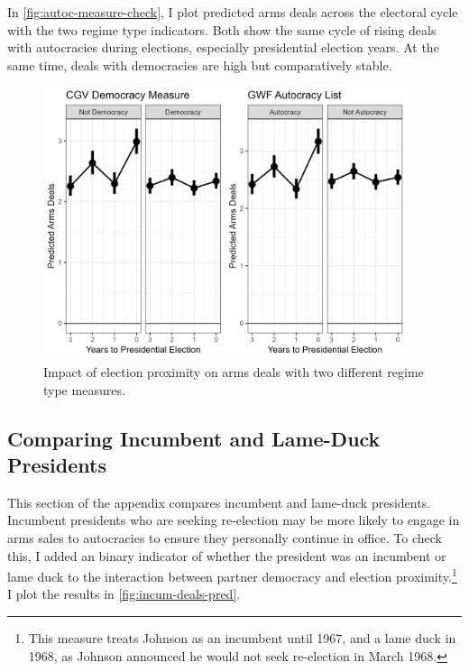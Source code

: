 \documentclass[12pt]{article}
\begin{document}
In \autoref{fig:autoc-measure-check}, I plot predicted arms deals across the electoral cycle with the two regime type indicators. 
Both show the same cycle of rising deals with autocracies during elections, especially presidential election years. 
At the same time, deals with democracies are high but comparatively stable. 

\begin{figure}[htpb]
	\centering
		\includegraphics[width=0.95\textwidth]{autoc-measure-check.png}
	\caption{Impact of election proximity on arms deals with two different regime type measures.}
	\label{fig:autoc-measure-check}
\end{figure}



\subsection{Comparing Incumbent and Lame-Duck Presidents}

This section of the appendix compares incumbent and lame-duck presidents. 
Incumbent presidents who are seeking re-election may be more likely to engage in arms sales to autocracies to ensure they personally continue in office. 
To check this, I added an binary indicator of whether the president was an incumbent or lame duck to the interaction between partner democracy and election proximity.\footnote{This measure treats Johnson as an incumbent until 1967, and a lame duck in 1968, as Johnson announced he would not seek re-election in March 1968.}
I plot the results in \autoref{fig:incum-deals-pred}.
\end{document}
